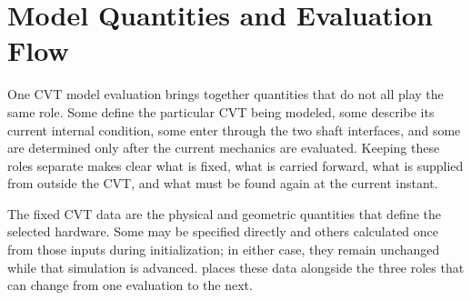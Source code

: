 \documentclass[11pt]{report}
\numberwithin{equation}{section}
\begin{document}
\section{Model Quantities and Evaluation Flow}
\label{sec:model_evaluation_flow}

One CVT model evaluation brings together quantities that do not all play the
same role. Some define the particular CVT being modeled, some describe its
current internal condition, some enter through the two shaft interfaces, and
some are determined only after the current mechanics are evaluated. Keeping
these roles separate makes clear what is fixed, what is carried forward, what
is supplied from outside the CVT, and what must be found again at the current
instant.

The fixed CVT data are the physical and geometric quantities that define the
selected hardware. Some may be specified directly and others calculated once
from those inputs during initialization; in either case, they remain unchanged
while that simulation is advanced.  places these
data alongside the three roles that can change from one evaluation to the next.
\end{document}
